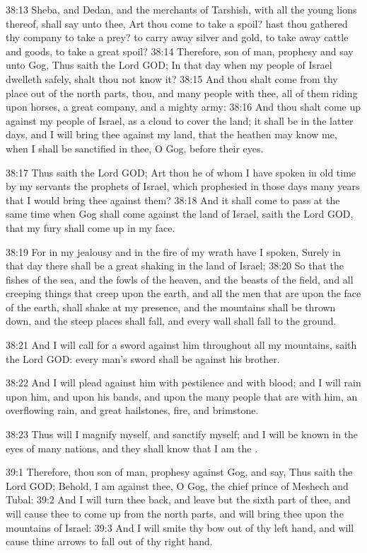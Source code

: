 38:13 Sheba, and Dedan, and the merchants of Tarshish, with all the
young lions thereof, shall say unto thee, Art thou come to take a
spoil? hast thou gathered thy company to take a prey? to carry away
silver and gold, to take away cattle and goods, to take a great spoil?
38:14 Therefore, son of man, prophesy and say unto Gog, Thus saith the
Lord GOD; In that day when my people of Israel dwelleth safely, shalt
thou not know it?  38:15 And thou shalt come from thy place out of the
north parts, thou, and many people with thee, all of them riding upon
horses, a great company, and a mighty army: 38:16 And thou shalt come
up against my people of Israel, as a cloud to cover the land; it shall
be in the latter days, and I will bring thee against my land, that the
heathen may know me, when I shall be sanctified in thee, O Gog, before
their eyes.

38:17 Thus saith the Lord GOD; Art thou he of whom I have spoken in
old time by my servants the prophets of Israel, which prophesied in
those days many years that I would bring thee against them?  38:18 And
it shall come to pass at the same time when Gog shall come against the
land of Israel, saith the Lord GOD, that my fury shall come up in my
face.

38:19 For in my jealousy and in the fire of my wrath have I spoken,
Surely in that day there shall be a great shaking in the land of
Israel; 38:20 So that the fishes of the sea, and the fowls of the
heaven, and the beasts of the field, and all creeping things that
creep upon the earth, and all the men that are upon the face of the
earth, shall shake at my presence, and the mountains shall be thrown
down, and the steep places shall fall, and every wall shall fall to
the ground.

38:21 And I will call for a sword against him throughout all my
mountains, saith the Lord GOD: every man's sword shall be against his
brother.

38:22 And I will plead against him with pestilence and with blood; and
I will rain upon him, and upon his bands, and upon the many people
that are with him, an overflowing rain, and great hailstones, fire,
and brimstone.

38:23 Thus will I magnify myself, and sanctify myself; and I will be
known in the eyes of many nations, and they shall know that I am the
\LORD.

39:1 Therefore, thou son of man, prophesy against Gog, and say, Thus
saith the Lord GOD; Behold, I am against thee, O Gog, the chief prince
of Meshech and Tubal: 39:2 And I will turn thee back, and leave but
the sixth part of thee, and will cause thee to come up from the north
parts, and will bring thee upon the mountains of Israel: 39:3 And I
will smite thy bow out of thy left hand, and will cause thine arrows
to fall out of thy right hand.

